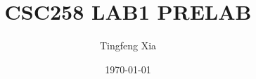 \documentclass[oneside, 10pt]{article}
\title{CSC258 LAB1 PRELAB}
\author{Tingfeng Xia}
\date{\today}
\begin{document}
\doclicenseThis
\maketitle
\end{document}
